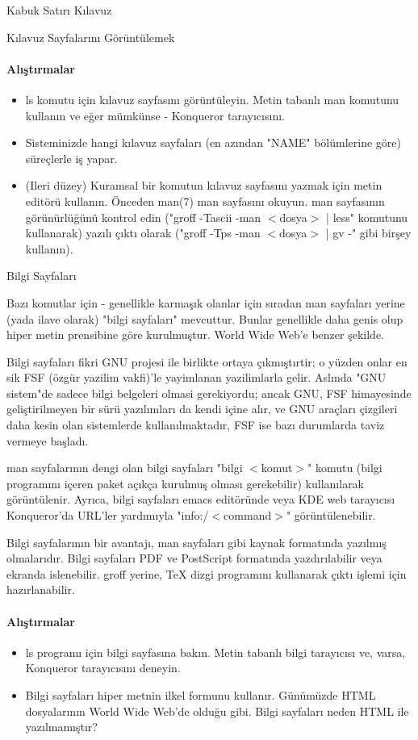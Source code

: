 \documentclass[10pt,a5paper]{book}
\begin{document}
\begin{section}{Kabuk Satırı Kılavuz}
\begin{subsection}{Kılavuz Sayfalarını Görüntülemek }
\paragraph{Alıştırmalar}{
\begin{itemize}
 \item ls komutu için kılavuz sayfasını görüntüleyin. Metin tabanlı man komutunu kullanın ve eğer mümkünse - Konqueror tarayıcısını.
 \item Sisteminizde hangi kılavuz sayfaları (en azından "NAME" bölümlerine göre) süreçlerle iş yapar.
 \item (Ileri düzey) Kuramsal bir komutun kılavuz sayfasını yazmak için metin editörü kullanın. Önceden man(7) man sayfasını okuyun. man sayfasının görünürlüğünü kontrol edin ("groff -Tascii -man $<$dosya$>$ | less" komutunu kullanarak) yazılı çıktı olarak ("groff -Tps -man $<$dosya$>$ | gv -" gibi birşey kullanın).
\end{itemize}}
\end{subsection}
\end{section}
\begin{section}{Bilgi Sayfaları}

Bazı komutlar için - genellikle karmaşık olanlar için sıradan man sayfaları yerine (yada ilave olarak) "bilgi sayfaları" mevcuttur.
Bunlar genellikle daha genis olup hiper metin prensibine göre kurulmuştur. World Wide Web'e benzer şekilde.

Bilgi sayfaları fikri GNU projesi ile birlikte ortaya çıkmıştırtir; o yüzden onlar en sik FSF (özgür yazilim vakfi)'le yayimlanan yazilimlarla gelir. Aslında "GNU sistem"de sadece bilgi belgeleri olmasi gerekiyordu; ancak GNU, FSF himayesinde geliştirilmeyen bir sürü yazılımları da kendi içine alır, ve GNU araçları çizgileri daha kesin olan sistemlerde kullanılmaktadır, FSF ise bazı durumlarda taviz vermeye başladı.

man sayfalarının dengi olan bilgi sayfaları "bilgi $<$komut$>$" komutu (bilgi programını içeren paket açıkça kurulmuş olması gerekebilir) kullanılarak görüntülenir. Ayrıca, bilgi sayfaları emacs editöründe veya KDE web tarayıcısı Konqueror'da URL'ler yardımıyla "info:/$<$command$>$" görüntülenebilir.

Bilgi sayfalarının bir avantajı, man sayfaları gibi kaynak formatında yazılmış olmalarıdır. Bilgi sayfaları PDF ve PostScript formatında yazdırılabilir veya ekranda islenebilir. groff yerine, \TeX{} dizgi programını kullanarak çıktı işlemi için hazırlanabilir.

\paragraph{Alıştırmalar}{
\begin{itemize}
 \item ls programı için bilgi sayfasına bakın. Metin tabanlı bilgi tarayıcısı ve, varsa, Konqueror tarayıcısını deneyin.
 \item Bilgi sayfaları hiper metnin ilkel formunu kullanır. Günümüzde HTML dosyalarının World Wide Web'de olduğu gibi. Bilgi sayfaları neden HTML ile yazılmamıştır?
\end{itemize}}
\end{section}
\end{document}

